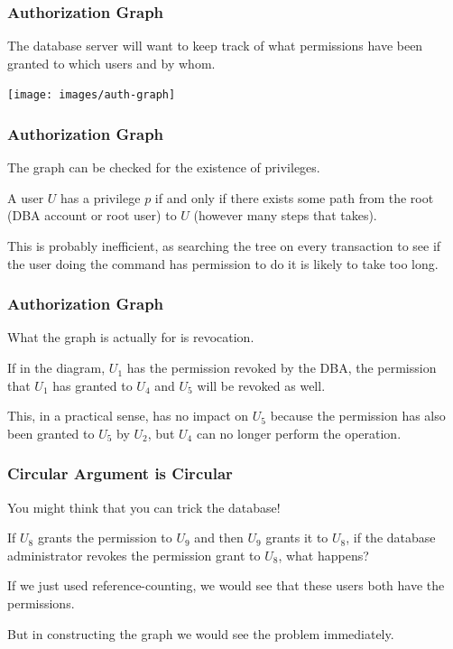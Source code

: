 \begin{frame}
\frametitle{Authorization Graph}
The database server will want to keep track of what permissions have been granted to which users and by whom.

\begin{center}
\texttt{[image: images/auth-graph]}
\end{center}

\end{frame}


\begin{frame}
\frametitle{Authorization Graph}

The graph can be checked for the existence of privileges. 

A user $U$ has a privilege $p$ if and only if there exists some path from the root (DBA account or root user) to $U$ (however many steps that takes). 

This is probably inefficient, as searching the tree on every transaction to see if the user doing the command has permission to do it is likely to take too long. 


\end{frame}



\begin{frame}
\frametitle{Authorization Graph}

What the graph is actually for is revocation. 

If in the diagram, $U_{1}$ has the permission revoked by the DBA, the permission that $U_{1}$ has granted to $U_{4}$ and $U_{5}$ will be revoked as well. 

This, in a practical sense, has no impact on $U_{5}$ because the permission has also been granted to $U_{5}$ by $U_{2}$, but $U_{4}$ can no longer perform the operation.


\end{frame}



\begin{frame}
\frametitle{Circular Argument is Circular}

You might think that you can trick the database! 

If $U_{8}$ grants the permission to $U_{9}$ and then $U_{9}$ grants it to $U_{8}$, if the database administrator revokes the permission grant to $U_{8}$, what happens? 

If we just used reference-counting, we would see that these users both have the permissions. 

But in constructing the graph we would see the problem immediately.

\end{frame}



